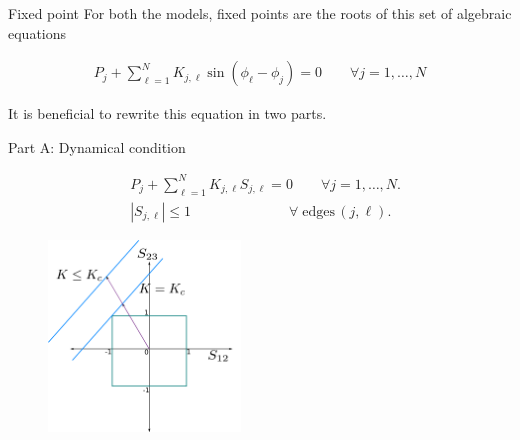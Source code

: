 \documentclass[xcolor=x11names,compress]{beamer}
\renewcommand{\(}{\begin{columns}}
\renewcommand{\)}{\end{columns}}
\newcommand{\<}[1]{\begin{column}{#1}}
\renewcommand{\>}{\end{column}}
\begin{document}
\begin{frame}{Fixed point}
For both the models, fixed points are the roots of this set of algebraic equations
\begin{block}{}
\begin{eqnarray*}
       P_j  + \sum_{\ell = 1}^N
      K _{j,\ell} \sin(\phi_\ell - \phi_j) =0 \qquad
     \forall j = 1,\ldots, N
    \label{eqn:def-steady-state}
\end{eqnarray*}
\end{block}

It is beneficial to rewrite this equation in two parts. 
\end{frame}

\begin{frame}{Part A: Dynamical condition}
\begin{block}{}
\begin{align}
   & P_j + \sum_{\ell=1}^N K _{j,\ell} S_{j,\ell} = 0 \qquad 
              \forall j=1,\ldots,N. \\
  &  |S_{j,\ell}|   \le 1 \quad \qquad \qquad \qquad  
              \forall \; \mbox{edges} \, (j,\ell).
\end{align} 
\end{block}


\begin{figure}
\begin{center}
\includegraphics[height=2in]{plane-cube-intersec}
\end{center}
\end{figure}
\end{frame}
\end{document}
